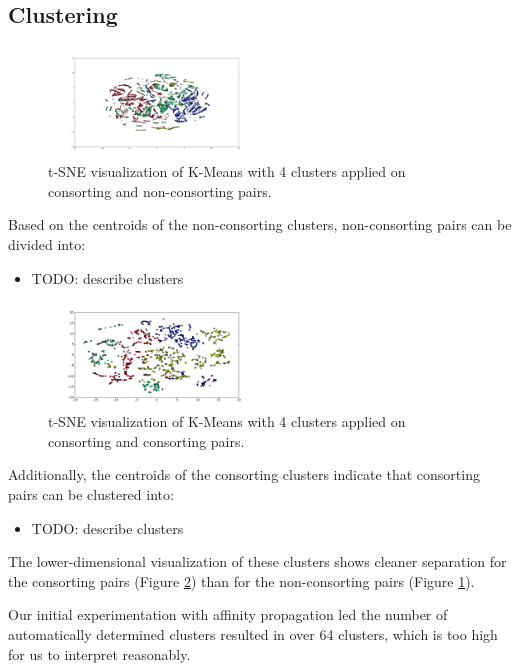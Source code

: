 \documentclass[twoside,twocolumn,paper=letter]{article}
\begin{document}
\subsection{Clustering}
\begin{figure}[h]
      \centering
          \includegraphics[width=0.5\textwidth]{../figs/non_consort_kmeans_2d_tsne.png}
  \caption{t-SNE visualization of K-Means with 4 clusters applied on consorting
  and non-consorting pairs.}
  \label{fig:non_consort_clustering_vis}
\end{figure}
Based on the centroids of the non-consorting clusters, non-consorting pairs can
be divided into:
\begin{itemize}
  \item{TODO: describe clusters}
\end{itemize}
\begin{figure}[h]
      \centering
          \includegraphics[width=0.5\textwidth]{../figs/consort_kmeans_2d_tsne.png}
  \caption{t-SNE visualization of K-Means with 4 clusters applied on consorting
  and consorting pairs.}
  \label{fig:consort_clustering_vis}
\end{figure}
Additionally, the centroids of the consorting clusters indicate that consorting
pairs can be clustered into:
\begin{itemize}
  \item{TODO: describe clusters}
\end{itemize}

The lower-dimensional visualization of these clusters shows cleaner separation
for the consorting pairs (Figure \ref{fig:consort_clustering_vis}) than for the
non-consorting pairs (Figure \ref{fig:non_consort_clustering_vis}).

Our initial experimentation with affinity propagation led the number of
automatically determined clusters resulted in over 64 clusters, which is too
high for us to interpret reasonably.
\end{document}
